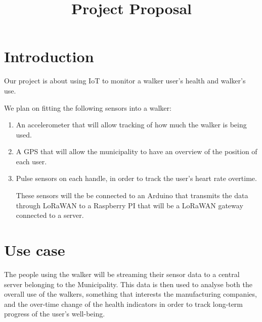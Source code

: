 \documentclass[conference]{IEEEtran}
\begin{document}
\title{Project Proposal}

\author{
\and
{}
\and
{}
}

\maketitle

\section{Introduction}
Our project is about using IoT to monitor a walker user's health and walker's use. 

We plan on fitting the following sensors into a walker:
\begin{enumerate}
	\item An accelerometer that will allow tracking of how much the walker is being used.
	\item A GPS that will allow the municipality to have an overview of the position of each user.
	\item Pulse sensors on each handle, in order to track the user's heart rate overtime.
	
These sensors will the be connected to an Arduino that transmits the data through LoRaWAN to a Raspberry PI that will be a LoRaWAN gateway connected to a server.
\end{enumerate}	

 	

\section{Use case}
	The people using the walker will be streaming their sensor data to a central server belonging to the Municipality. This data is then used to analyse both the overall use of the walkers, something that interests the manufacturing companies, and the over-time change of the health indicators in order to track long-term progress of the user's well-being.
\end{document}
